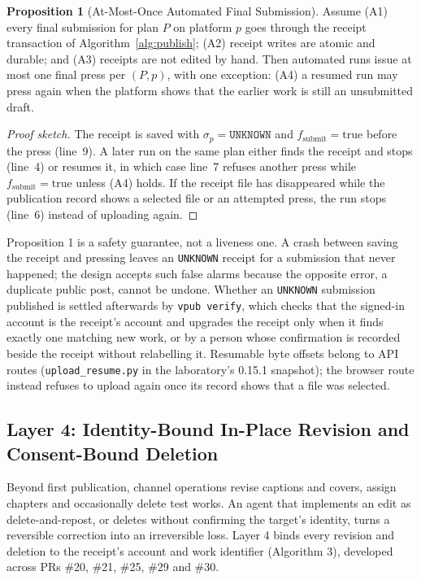 \documentclass[11pt,a4paper]{article}
\theoremstyle{definition}
\newtheorem{proposition}{Proposition}
\begin{document}
\begin{proposition}[At-Most-Once Automated Final Submission]
\label{prop:idempotency}
Assume (A1) every final submission for plan $P$ on platform $p$ goes through the receipt transaction of Algorithm~\ref{alg:publish}; (A2) receipt writes are atomic and durable; and (A3) receipts are not edited by hand. Then automated runs issue at most one final press per $(P, p)$, with one exception: (A4) a resumed run may press again when the platform shows that the earlier work is still an unsubmitted draft.
\end{proposition}
\begin{proof}[Proof sketch]
The receipt is saved with $\sigma_p = \texttt{UNKNOWN}$ and $f_{\text{submit}} = \text{true}$ before the press (line~9). A later run on the same plan either finds the receipt and stops (line~4) or resumes it, in which case line~7 refuses another press while $f_{\text{submit}} = \text{true}$ unless (A4) holds. If the receipt file has disappeared while the publication record shows a selected file or an attempted press, the run stops (line~6) instead of uploading again.
\end{proof}

Proposition 1 is a safety guarantee, not a liveness one. A crash between saving the receipt and pressing leaves an \texttt{UNKNOWN} receipt for a submission that never happened; the design accepts such false alarms because the opposite error, a duplicate public post, cannot be undone. Whether an \texttt{UNKNOWN} submission published is settled afterwards by \texttt{vpub verify}, which checks that the signed-in account is the receipt's account and upgrades the receipt only when it finds exactly one matching new work, or by a person whose confirmation is recorded beside the receipt without relabelling it. Resumable byte offsets belong to API routes (\texttt{upload\_\allowbreak{}resume.\allowbreak{}py} in the laboratory's 0.15.1 snapshot); the browser route instead refuses to upload again once its record shows that a file was selected.

\subsection{Layer 4: Identity-Bound In-Place Revision and Consent-Bound Deletion}
\label{sec:4.5}

Beyond first publication, channel operations revise captions and covers, assign chapters and occasionally delete test works. An agent that implements an edit as delete-and-repost, or deletes without confirming the target's identity, turns a reversible correction into an irreversible loss. Layer 4 binds every revision and deletion to the receipt's account and work identifier (Algorithm 3), developed across PRs \#20, \#21, \#25, \#29 and \#30.
\end{document}
